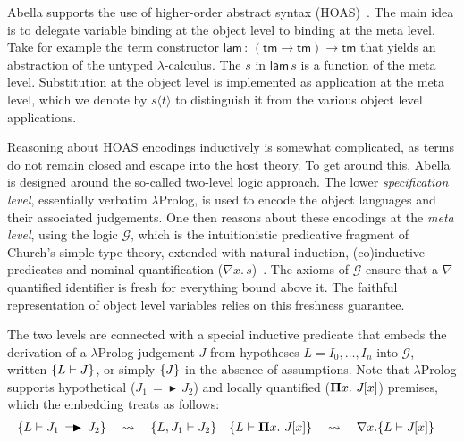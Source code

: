 \documentclass[a4paper,UKenglish]{lipics-v2016}
\newcommand{\ms}{\,}
\newcommand{\mrel}[1]{\mathrel{\ms #1 \ms}}
\newcommand{\OF}{\mrel{:}}
\newcommand{\lpPi}[1]{\mathbf{\Pi} #1.\ms\ms}
\newcommand{\lpApp}[2]{#1\langle#2\rangle}
\newcommand{\lpImp}{\mrel{=\!\blacktriangleright}}
\newcommand{\subst}[1]{\hphantom{|}\!\![{#1}]}
\theoremstyle{plain}
\begin{document}
Abella supports the use of higher-order abstract syntax (HOAS)~\cite{DBLP:conf/pldi/PfenningE88}.
The main idea is to delegate variable binding at the object level to binding at the meta level.
Take for example the term constructor $\mathsf{lam} \OF (\mathsf{tm} \to \mathsf{tm}) \to \mathsf{tm}$ that yields an abstraction of the untyped $\lambda$-calculus.
The $s$ in $\mathsf{lam}\,s$ is a function of the meta level.
Substitution at the object level is implemented as application at the meta level, which we denote by $\lpApp{s}{t}$ to distinguish it from the various object level applications.

Reasoning about HOAS encodings inductively is somewhat complicated, as terms do not remain closed and escape into the host theory.
To get around this, Abella is designed around the so-called two-level logic approach.
The lower \emph{specification level}, essentially verbatim $\lambda$Prolog, is used to encode the object languages and their associated judgements.
One then reasons about these encodings at the \emph{meta level}, using the logic $\mathcal{G}$, which is the intuitionistic predicative fragment of Church's simple type theory, extended with natural induction, (co)inductive predicates and nominal quantification ($\nabla x . \ms s$)~\cite{Gacek:LICS08,Gacek:JAR12}.
The axioms of $\mathcal{G}$ ensure that a $\nabla$-quantified identifier is fresh for everything bound above it.
The faithful representation of object level variables relies on this freshness guarantee.

The two levels are connected with a special inductive predicate that embeds the derivation of a $\lambda$Prolog judgement $J$ from hypotheses $L = I_0,\ldots,I_n$ into $\mathcal{G}$, written $\{L \vdash J\}$, or simply $\{J\}$ in the absence of assumptions.
Note that $\lambda$Prolog supports hypothetical ($J_1 \lpImp J_2$) and locally quantified ($\lpPi{x} J\subst{x}$) premises, which the embedding treats as follows:
\begin{align*}
  \aj{L}{J_1 \lpImp J_2} &\quad\leadsto\quad \aj{L, J_1}{J_2} & \aj{L}{\lpPi{x} J\subst{x}}&\quad\leadsto\quad \nabla x. \aj{L}{J\subst{x}}
\end{align*}
\end{document}
